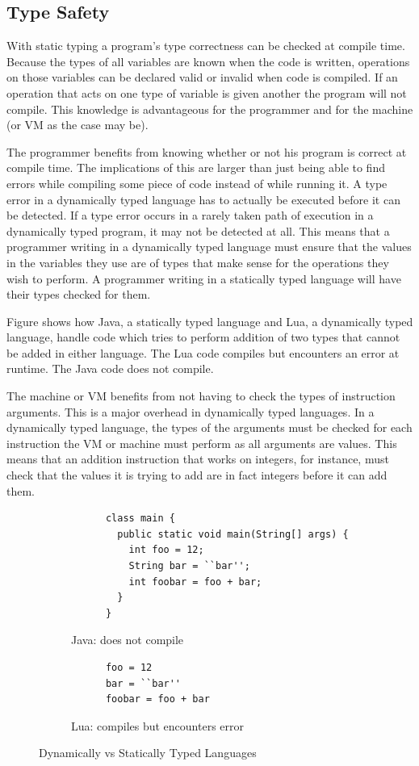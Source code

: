 \documentclass[english,a4paper]{report}
\begin{document}
\subsection{Type Safety }
With static typing a program's type correctness can be checked at
compile time. Because the types of all variables are known when the
code is written, operations on those variables can be declared valid
or invalid when code is compiled. If an operation that acts on one
type of variable is given another the program will not compile. This
knowledge is advantageous for the programmer and for the machine (or
VM as the case may be).

The programmer benefits from knowing whether or not his program is
correct at compile time. The implications of this are larger than just
being able to find errors while compiling some piece of code instead
of while running it. A type error in a dynamically typed language has
to actually be executed before it can be detected. If a type error
occurs in a rarely taken path of execution in a dynamically typed
program, it may not be detected at all. This means that a programmer
writing in a dynamically typed language must ensure that the values in
the variables they use are of types that make sense for the operations
they wish to perform. A programmer writing in a statically typed
language will have their types checked for them.

Figure \pageref{fig:dvs} shows how Java, a statically typed language
and Lua, a dynamically typed language, handle code which tries to
perform addition of two types that cannot be added in either
language. The Lua code compiles but encounters an error at
runtime. The Java code does not compile.

The machine or VM benefits from not having to check the types of
instruction arguments. This is a major overhead in dynamically typed
languages. In a dynamically typed language, the types of the arguments
must be checked for each instruction the VM or machine must perform as
all arguments are values. This means that an addition instruction that
works on integers, for instance, must check that the values it is
trying to add are in fact integers before it can add them.

\begin{figure}
  \begin{subfigure}{.48\textwidth}
    \begin{lstlisting}
      class main {
        public static void main(String[] args) {
          int foo = 12;
          String bar = ``bar'';
          int foobar = foo + bar;
        }
      }
    \end{lstlisting}
    \caption{Java: does not compile}
  \end{subfigure}
  \begin{subfigure}{.48\textwidth}
    \begin{lstlisting}
      foo = 12
      bar = ``bar''
      foobar = foo + bar
    \end{lstlisting}
    \caption{Lua: compiles but encounters error}
  \end{subfigure}
  \caption{Dynamically vs Statically Typed Languages}
  \label{fig:dvs}
\end{figure}
\end{document}
